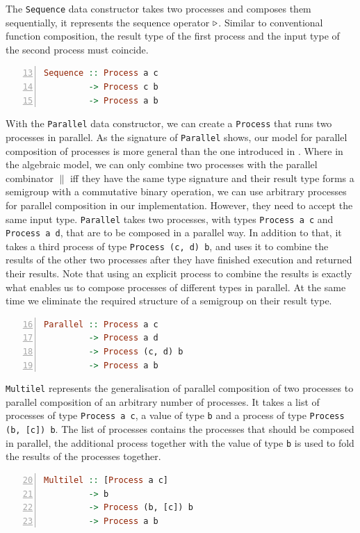 The \texttt{Sequence} data constructor takes two processes and composes them sequentially, it represents the sequence operator $\triangleright$. Similar to conventional function composition, the result type of the first process and the input type of the second process must coincide.
\begin{lstlisting}[language=Haskell,caption=Signature of the \texttt{Seqeuence} data constructor.,numbers=left,frame=bt,firstnumber=13]
Sequence :: Process a c
         -> Process c b
         -> Process a b
\end{lstlisting}

With the \texttt{Parallel} data constructor, we can create a \texttt{Process} that runs two processes in parallel. As the signature of \texttt{Parallel} shows, our model for parallel composition of processes is more general than the one introduced in . Where in the algebraic model, we can only combine two processes with the parallel combinator $\parallel$ iff they have the same type signature and their result type forms a semigroup with a commutative binary operation, we can use arbitrary processes for parallel composition in our implementation. However, they need to accept the same input type. \texttt{Parallel} takes two processes, with types \texttt{Process a c} and \texttt{Process a d}, that are to be composed in a parallel way. In addition to that, it takes a third process of type \texttt{Process (c, d) b}, and uses it to combine the results of the other two processes after they have finished execution and returned their results. Note that using an explicit process to combine the results is exactly what enables us to compose processes of different types in parallel. At the same time we eliminate the required structure of a semigroup on their result type.
\begin{lstlisting}[language=Haskell,caption=Signature of the \texttt{Parallel} data constructor.,numbers=left,frame=bt,firstnumber=16]
Parallel :: Process a c
         -> Process a d
         -> Process (c, d) b
         -> Process a b
\end{lstlisting}

\texttt{Multilel} represents the generalisation of parallel composition of two processes to parallel composition of an arbitrary number of processes. It takes a list of processes of type \texttt{Process a c}, a value of type \texttt{b} and a process of type \texttt{Process (b, [c]) b}. The list of processes contains the processes that should be composed in parallel, the additional process together with the value of type \texttt{b} is used to fold the results of the processes together.
\begin{lstlisting}[language=Haskell,caption=Signature of the \texttt{Multilel} data constructor.,numbers=left,frame=bt,firstnumber=20]
Multilel :: [Process a c]
         -> b
         -> Process (b, [c]) b
         -> Process a b
\end{lstlisting}

